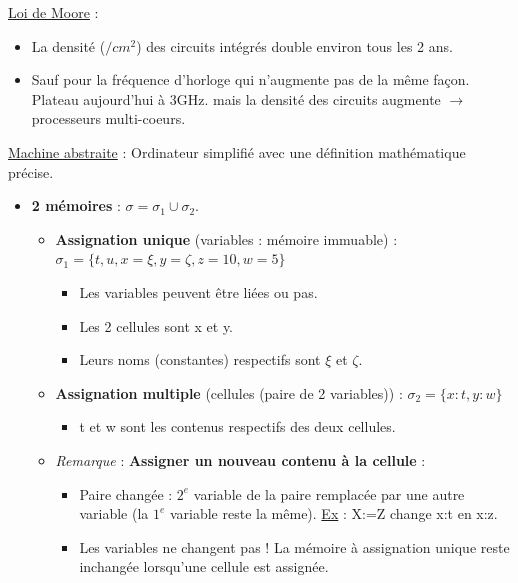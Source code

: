 \documentclass[fr,license=none,skiptoc]{../../../eplsummary}
\begin{document}
\begin{flushleft}
\textcolor{mauvedef}{\underline{Loi de Moore}} :

\begin{itemize}
\item La densité ($/cm^2$) des circuits intégrés double environ tous les 2 ans.
\item Sauf pour la fréquence d'horloge qui n'augmente pas de la même façon. Plateau aujourd'hui à 3GHz. mais la densité des circuits augmente $\rightarrow$ processeurs multi-coeurs.
\end{itemize} \bigbreak


\textcolor{mauvedef}{\underline{Machine abstraite}} : Ordinateur simplifié avec une définition mathématique précise.
\begin{itemize}

\item \textbf{2 mémoires} : \textcolor{miorangerouge}{$\sigma = \sigma_1 \cup \sigma_2$}.

\begin{itemize}[label=\textbullet]
\item \textbf{Assignation unique} (variables : mémoire immuable) : \textcolor{miorangerouge}{$\sigma_1 = \{t, u, x = \xi , y = \zeta , z = 10, w = 5 \}$}

\begin{itemize}[label=\circ]
\item Les variables peuvent être liées ou pas.
\item Les 2 cellules sont x et y.
\item Leurs noms (constantes) respectifs sont $\xi$ et $\zeta$.
\end{itemize}

\item \textbf{Assignation multiple} (cellules (paire de 2 variables)) : \textcolor{miorangerouge}{$\sigma_2 = \{ x:t , y:w \}$}

\begin{itemize}[label=\circ]
\item t et w sont les contenus respectifs des deux cellules.
\end{itemize}

\item \textit{Remarque} : \textbf{Assigner un nouveau contenu à la cellule} : 

\begin{itemize}[label=\circ]
\item Paire changée : $2^e$ variable de la paire remplacée par une autre variable (la $1^e$ variable reste la même). \underline{Ex} : X:=Z change x:t en x:z.
\item Les variables ne changent pas ! La mémoire à assignation unique reste inchangée lorsqu'une cellule est assignée.
\end{itemize}


\end{itemize}
\end{itemize}
\end{flushleft}
\end{document}
